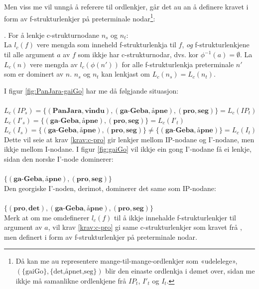 \documentclass[12pt,a4paper,oneside,draft]{report}
\begin{document}
Men viss me vil unngå å referere til ordlenkjer, går det au an å
definere kravet i form av f\hyp{}strukturlenkjer på preterminale
nodar\footnote{Då kan me au representere mange-til-mange-ordlenkjer som
        «udelelege», $(\{\text{gaiGo}\},\{\text{det,åpnet,seg}\})$
        blir den einaste ordlenkja i dømet over, sidan me ikkje må
        samanlikne ordlenkjene frå $IP_t$, $I'_t$ og $I_t$. }:

\ex. \label{krav:c-pro} For å lenkje c\hyp{}strukturnodane $n_s$ og
     $n_t$:\\
     La $l_c(f)$ vere mengda som inneheld
     f\hyp{}strukturlenkja til $f$, \emph{og} f\hyp{}strukturlenkjene til alle
     argument $a$ av $f$ som ikkje har c\hyp{}strukturnodar, dvs. kor
     $\phi^{-1}(a)=\emptyset$.
     La $L_c(n)$ vere mengda av $l_c(\phi(n'))$ for alle
     f\hyp{}strukturlenkja preterminale $n'$ som er dominert av $n$.
     $n_s$ og $n_t$ kan lenkjast om $L_c(n_s)=L_c(n_t)$.

I figur \ref{fig:PanJara-gaiGo} har me då følgjande situasjon:\\
\\$L_c(IP_s)=\{(\textbf{PanJara},\textbf{vindu}),(\textbf{ga-Geba},\textbf{åpne}),(\textbf{pro},\textbf{seg})\}=L_c(IP_t)$
\\$L_c(I'_s)=\{(\textbf{ga-Geba},\textbf{åpne}),(\textbf{pro},\textbf{seg})\}=L_c(I'_t)$
\\$L_c(I_s)=\{(\textbf{ga-Geba},\textbf{åpne}),(\textbf{pro},\textbf{seg})\}
\neq \{(\textbf{ga-Geba},\textbf{åpne})\}=L_c(I_t)$\\

Dette vil seie at krav \ref{krav:c-pro} gir lenkjer mellom
IP-nodane og I'-nodane, men ikkje mellom I-nodane. I figur
\ref{fig:gaiGo} vil ikkje ein gong I'-nodane få ei lenkje, sidan den
norske I'-node dominerer:\\
\\$\{(\textbf{ga-Geba},\textbf{åpne}), (\textbf{pro},\textbf{seg})\}$\\

Den georgiske I'-noden, derimot, dominerer det same som IP-nodane:\\
\\$\{ (\textbf{pro},\textbf{det}), (\textbf{ga-Geba},\textbf{åpne}),
(\textbf{pro},\textbf{seg}) \}$\\

Merk at om me omdefinerer $l_c(f)$ til å ikkje innehalde
f\hyp{}strukturlenkjer til argument av $a$, vil krav \ref{krav:c-pro} gi
same c\hyp{}strukturlenkjer som kravet frå \cite{dyvik2009lmp}, men
definert i form av f\hyp{}strukturlenkjer på preterminale nodar.
\end{document}

